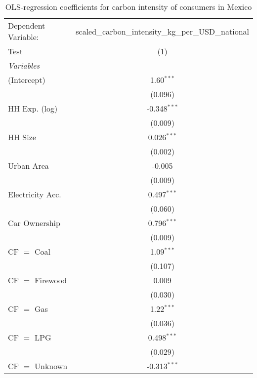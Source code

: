 
\begin{table}[htbp!]
   \centering
   \small
   \begin{adjustbox}{width = 1\textwidth, max height = 0.95\textheight, center}
      \begin{threeparttable}[b]
         \caption{\label{tab:OLS_1_MEX} OLS-regression coefficients for carbon intensity of consumers in Mexico}
         \begin{tabular}{lc}
            \tabularnewline \midrule \midrule
            Dependent Variable: & scaled\_carbon\_intensity\_kg\_per\_USD\_national\\        
            Test                & (1)\\  
            \midrule
            \emph{Variables}\\
            (Intercept)         & 1.60$^{***}$\\   
                                & (0.096)\\   
            HH Exp. (log)       & -0.348$^{***}$\\   
                                & (0.009)\\   
            HH Size             & 0.026$^{***}$\\   
                                & (0.002)\\   
            Urban Area          & -0.005\\   
                                & (0.009)\\   
            Electricity Acc.    & 0.497$^{***}$\\   
                                & (0.060)\\   
            Car Ownership       & 0.796$^{***}$\\   
                                & (0.009)\\   
            CF $=$ Coal         & 1.09$^{***}$\\   
                                & (0.107)\\   
            CF $=$ Firewood     & 0.009\\   
                                & (0.030)\\   
            CF $=$ Gas          & 1.22$^{***}$\\   
                                & (0.036)\\   
            CF $=$ LPG          & 0.498$^{***}$\\   
                                & (0.029)\\   
            CF $=$ Unknown      & -0.313$^{***}$\\   

\end{tabular}
\end{threeparttable}
\end{adjustbox}
\end{table}

